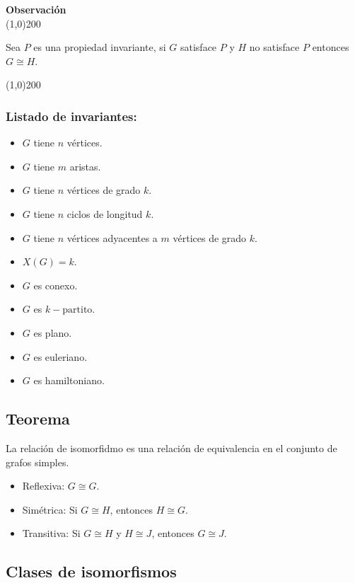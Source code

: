 \documentclass[a4paper]{book}
\newenvironment{obs}
    {
        \begin{flushleft}
       \textbf{Observación}\\
        \line(1,0){200} \\
        \end{flushleft}
    }
    {
        \begin{flushright}
        \line(1,0){200}
        \end{flushright}
    }
\begin{document}
\begin{obs}
    Sea \(P\) es una propiedad invariante, si \(G\) satisface \(P\) y \(H\) no
    satisface \(P\) entonces \(G\cong H\).
\end{obs}
\subsubsection{Listado de invariantes:}

\begin{itemize}
    \item \(G\) tiene \(n\) vértices.
    \item \(G\) tiene \(m\) aristas.
    \item \(G\) tiene \(n\) vértices de grado \(k\).
    \item \(G\) tiene \(n\) ciclos de longitud \(k\).
    \item \(G\) tiene \(n\) vértices adyacentes a \(m\) vértices de grado
        \(k\).
    \item \(X\left(G\right)=k\).
    \item  \(G\) es conexo.
    \item \(G\) es \(k-\text{partito}\).
    \item \(G\) es plano.
    \item \(G\) es euleriano.
    \item \(G\) es hamiltoniano.
\end{itemize}


\subsection{Teorema}
\label{ssec:teorema}

La relación de isomorfidmo es una relación de equivalencia en el conjunto de
grafos simples.

\begin{itemize}
    \item Reflexiva: \(G\cong G\).
    \item Simétrica: Si \(G\cong H\), entonces \(H\cong G\).
    \item Transitiva: Si \(G\cong H\) y \(H\cong J\), entonces \(G\cong J\).
\end{itemize}

\subsection{Clases de isomorfismos}
\label{ssec:clases_de_isomorfismos}
\end{document}
